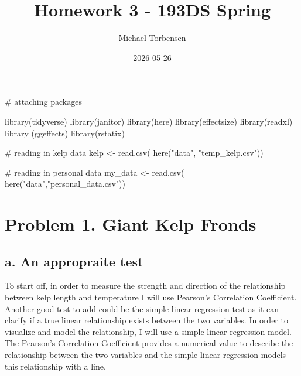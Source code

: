 \documentclass[
  letterpaper,
  DIV=11,
  numbers=noendperiod]{scrartcl}
\title{Homework 3 - 193DS Spring}
\author{Michael Torbensen}
\date{2026-05-26}
\newenvironment{Shaded}{\begin{snugshade}}{\end{snugshade}}
\newcommand{\CommentTok}[1]{\textcolor[rgb]{0.37,0.37,0.37}{#1}}
\newcommand{\FunctionTok}[1]{\textcolor[rgb]{0.28,0.35,0.67}{#1}}
\newcommand{\NormalTok}[1]{\textcolor[rgb]{0.00,0.23,0.31}{#1}}
\newcommand{\OtherTok}[1]{\textcolor[rgb]{0.00,0.23,0.31}{#1}}
\newcommand{\StringTok}[1]{\textcolor[rgb]{0.13,0.47,0.30}{#1}}
\renewcommand*\contentsname{Table of contents}
\newcommand\contentsname{Table of contents}
\begin{document}
\maketitle

\renewcommand*\contentsname{Table of contents}
{
\setcounter{tocdepth}{3}
\tableofcontents
}

\begin{Shaded}
\begin{Highlighting}[]
\CommentTok{\# attaching packages }

\FunctionTok{library}\NormalTok{(tidyverse)}
\FunctionTok{library}\NormalTok{(janitor)}
\FunctionTok{library}\NormalTok{(here)}
\FunctionTok{library}\NormalTok{(effectsize)}
\FunctionTok{library}\NormalTok{(readxl)}
\FunctionTok{library}\NormalTok{ (ggeffects)}
\FunctionTok{library}\NormalTok{(rstatix)}

\CommentTok{\# reading in kelp data }
\NormalTok{kelp }\OtherTok{\textless{}{-}} \FunctionTok{read.csv}\NormalTok{(}
  \FunctionTok{here}\NormalTok{(}\StringTok{"data"}\NormalTok{, }\StringTok{"temp\_kelp.csv"}\NormalTok{))}

\CommentTok{\# reading in personal data }
\NormalTok{my\_data }\OtherTok{\textless{}{-}} \FunctionTok{read.csv}\NormalTok{(}
  \FunctionTok{here}\NormalTok{(}\StringTok{"data"}\NormalTok{,}\StringTok{"personal\_data.csv"}\NormalTok{))}
\end{Highlighting}
\end{Shaded}

\section{Problem 1. Giant Kelp
Fronds}\label{problem-1.-giant-kelp-fronds}

\subsection{a. An appropraite test}\label{a.-an-appropraite-test}

To start off, in order to measure the strength and direction of the
relationship between kelp length and temperature I will use Pearson's
Correlation Coefficient. Another good test to add could be the simple
linear regression test as it can clarify if a true linear relationship
exists between the two variables. In order to visualize and model the
relationship, I will use a simple linear regression model. The Pearson's
Correlation Coefficient provides a numerical value to describe the
relationship between the two variables and the simple linear regression
models this relationship with a line.
\end{document}
